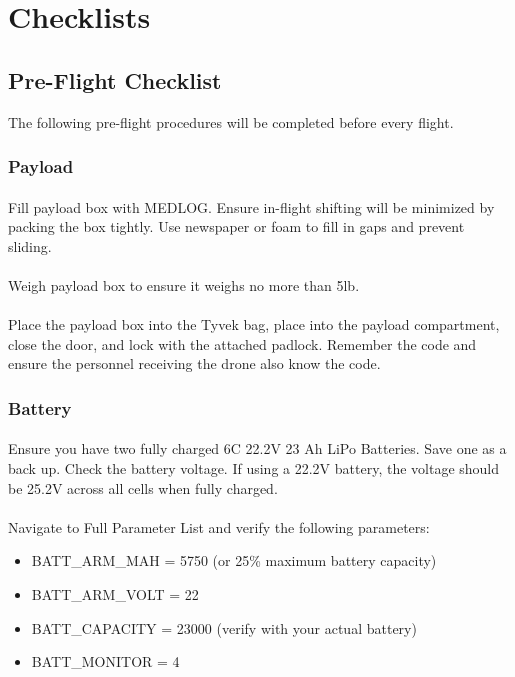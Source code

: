 \chapter{Checklists}
\label{ch:checklists}

\section{Pre-Flight Checklist}\label{cl:preflight}
 The following pre-flight procedures will be completed before every flight. 
    \subsection{Payload} 
        \subsubsection{} Fill payload box with MEDLOG. Ensure in-flight shifting will be minimized by packing the box tightly. Use newspaper or foam to fill in gaps and prevent sliding.
        \subsubsection{} Weigh payload box to ensure it weighs no more than 5lb. 
        \subsubsection{} Place the payload box into the Tyvek bag, place into the payload compartment, close the door, and lock with the attached padlock. Remember the code and ensure the personnel receiving the drone also know the code.

    \subsection{Battery} 
        \subsubsection{} Ensure you have two fully charged 6C 22.2V 23 Ah LiPo Batteries. Save one as a back up. Check the battery voltage. If using a 22.2V battery, the voltage should be 25.2V across all cells when fully charged. 
        \subsubsection{} Navigate to Full Parameter List and verify the following parameters:
        \begin{itemize}
            \item BATT\_ARM\_MAH = 5750 (or 25\% maximum battery capacity)
            \item BATT\_ARM\_VOLT = 22
            \item BATT\_CAPACITY = 23000 (verify with your actual battery)
            \item BATT\_MONITOR = 4
        \end{itemize}
        

